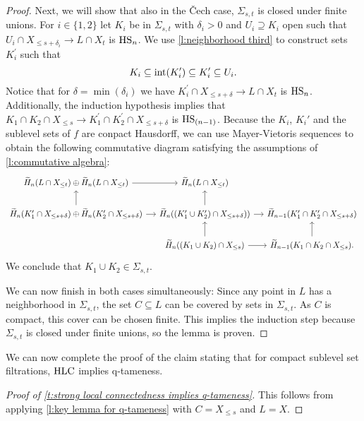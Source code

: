 \begin{proof}
 	Next, we will show that also in the \v{C}ech case, $\Sigma_{s,t}$ is closed under finite unions.
 	For $i \in \{1, 2\}$ let $K_i$ be in $\Sigma_{s,t}$ with $\delta_i > 0$ and $U_i \supseteq K_i$ open such that $U_{i} \cap X_{\leq s+\delta_i} \to L \cap X_{t}$ is $\mathrm{HS}_n$.
	We use \cref{l:neighborhood third} to construct sets $K_i^\prime$ such that
	\begin{equation*}
	K_i \subseteq \operatorname{int}(K_i^\prime) \subseteq K_i^\prime \subseteq U_i.
	\end{equation*}
	Notice that for $\delta = \min(\delta_i)$ we have $K_i^\prime \cap X_{\leq s+\delta} \to L \cap X_t$ is $\mathrm{HS}_n$.
	Additionally, the induction hypothesis implies that $K_1 \cap K_2 \cap X_{\leq s} \to K_1^\prime \cap K_2^\prime \cap X_{\leq s+\delta}$ is $\mathrm{HS}_{(n-1)}$.
	Because the $K_i$, $K_i'$ and the sublevel sets of $f$ are conpact Hausdorff, we can use Mayer-Vietoris sequences to obtain the following commutative diagram satisfying the assumptions of \cref{l:commutative algebra}:
	\begin{equation*}
	\begin{tikzcd}[column sep=small]
	\H_n(L \cap X_{\leq t}) \oplus \H_n(L \cap X_{\leq t}) \arrow[r] &
	\H_n(L \cap X_{\leq t}) & \\
	\H_{n}(K_1^\prime \cap X_{\leq s+\delta}) \oplus \H_n(K_2^\prime \cap X_{\leq s+\delta}) \arrow[r] \arrow[u] & 
	\H_{n}((K_1^\prime \cup K_2^\prime) \cap X_{\leq s+\delta})) \arrow[r] \arrow[u] &
	\H_{n-1}(K_1^\prime \cap K_2^\prime \cap X_{\leq s+\delta}) \\ & 
	\H_{n}((K_1 \cup K_2) \cap X_{\leq s}) \arrow[r] \arrow[u] &
	\H_{n-1}(K_1 \cap K_2 \cap X_{\leq s}). \arrow[u]
	\end{tikzcd}
	\end{equation*}
	We conclude that $K_1 \cup K_2 \in \Sigma_{s, t}$.
	
	We can now finish in both cases simultaneously: Since any point in $L$ has a neighborhood in $\Sigma_{s,t}$, the set $C \subseteq L$ can be covered by sets in $\Sigma_{s,t}$. As $C$ is compact, this cover can be chosen finite. This implies the induction step because $\Sigma_{s,t}$ is closed under finite unions, so the lemma is proven.
\end{proof}

We can now complete the proof of the claim stating that for compact sublevel set filtrations, $\mathrm{HLC}$ implies q-tameness. 
\begin{proof}[Proof of \cref{t:strong local connectedness implies q-tameness}]
	This follows from applying \cref{l:key lemma for q-tameness} with $C = X_{\leq s}$ and $L = X$.
\end{proof}

